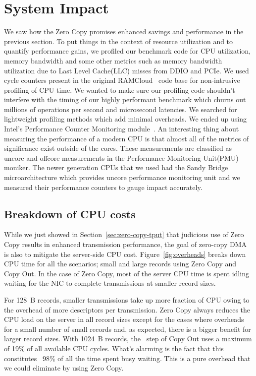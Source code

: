 \section{System Impact}
\label{sec:impact}

We saw how the Zero Copy promises enhanced savings and performance 
in the previous section. To put things in the context of resource utilization and
 to quantify performance gains, we profiled our benchmark code for CPU utilization, memory bandwidth 
 and some other metrics such as memory bandwidth utilization due to Last Level Cache(LLC) misses from DDIO and PCIe.
We used cycle counters present in the original RAMCloud~\cite{ramcloud} code base for non-intrusive profiling 
of CPU time. We wanted to make sure our profiling code shouldn't interfere with the timing of our highly performant 
 benchmark which churns out millions of operations per second and microsecond latencies. 
 We searched for lightweight profiling methods which add minimal overheads.
 We ended up using Intel\textregistered's Performance Counter Monitoring module~\cite{intelpcm}. 
 An interesting thing about measuring the performance 
 of a modern CPU is that almost all of the metrics of significance exist outside of the cores. These measurements 
 are classified as uncore and offcore measurements in the Performance Monitoring Unit(PMU) moniker.
 The newer generation CPUs that we used had the Sandy Bridge microarchitecture which provides uncore performance 
 monitoring unit and we measured their performance counters to gauge impact accurately.


\subsection{Breakdown of CPU costs}
\label{sec:overhead}

While we just showed in Section~\ref{sec:zero-copy-tput} that judicious use of Zero Copy results 
in enhanced transmission performance, the goal of zero-copy DMA is also to 
mitigate the server-side CPU cost. Figure~\ref{fig:overheads} breaks down CPU time for 
all the scenarios; small and large records using Zero Copy and Copy Out. In the case 
of Zero Copy, most of the server CPU time is spent idling waiting for the NIC 
to complete transmissions at smaller record sizes.

 For 128~B records, smaller transmissions take up more fraction of CPU owing to the overhead of more descriptors
per transmission. Zero Copy always reduces the CPU load on the server in all record sizes except for the cases where
overheads for a small number of small records and, as expected, there is a bigger
benefit for larger record sizes. With 1024~B records, the \memcpy ~step of Copy Out uses a maximum of 19\% of all available
CPU cycles. What's alarming is the fact that this constitutes ~98\% of all the time spent busy waiting.
This is a pure overhead that we could eliminate by using Zero Copy.

